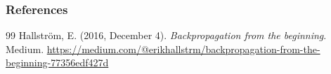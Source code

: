 \documentclass[11pt,compress,t,notes=noshow, xcolor=table]{beamer}
\begin{document}
\begin{vbframe}
\frametitle{References}
\footnotesize{
\begin{thebibliography}{99}
Hallström, E. (2016, December 4). \textit{Backpropagation from the beginning}. Medium. \url{https://medium.com/@erikhallstrm/backpropagation-from-the-beginning-77356edf427d} 
\end{thebibliography}
}
\end{vbframe}


\endlecture
\end{document}
